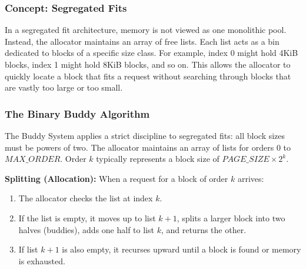 \documentclass[a4paper,10pt,twoside]{report}
\theoremstyle{definition}
\begin{document}
\subsubsection{Concept: Segregated Fits}
In a segregated fit architecture, memory is not viewed as one monolithic pool. Instead, the allocator maintains an array of free lists. Each list acts as a bin dedicated to blocks of a specific size class. For example, index 0 might hold 4KiB blocks, index 1 might hold 8KiB blocks, and so on. This allows the allocator to quickly locate a block that fits a request without searching through blocks that are vastly too large or too small.

\subsubsection{The Binary Buddy Algorithm}
The Buddy System applies a strict discipline to segregated fits: all block sizes must be powers of two. The allocator maintains an array of lists for orders $0$ to $MAX\_ORDER$. Order $k$ typically represents a block size of $PAGE\_SIZE \times 2^k$.

\textbf{Splitting (Allocation):} When a request for a block of order $k$ arrives:
\begin{enumerate}
    \item The allocator checks the list at index $k$.
    \item If the list is empty, it moves up to list $k+1$, splits a larger block into two halves (buddies), adds one half to list $k$, and returns the other.
    \item If list $k+1$ is also empty, it recurses upward until a block is found or memory is exhausted.
\end{enumerate}
\end{document}

